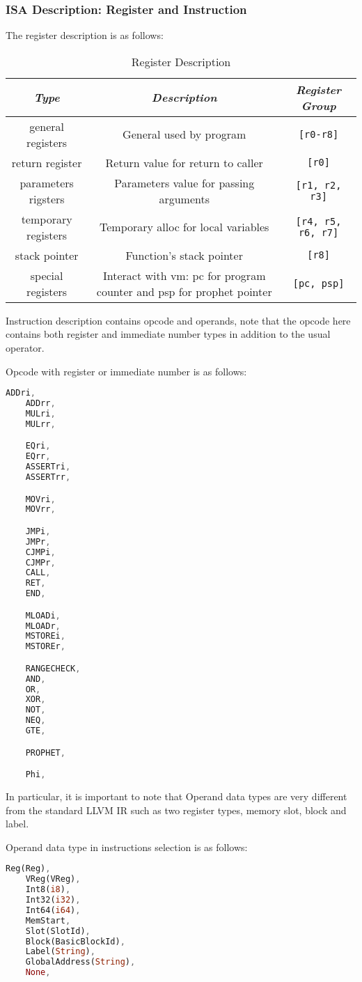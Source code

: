 \subsubsection{ISA Description: Register and Instruction}

The register description is as follows:
\begin{table}[!ht]
    \centering
    \begin{tabular}{|c|c|c|}
        \hline
        \textit{Type}  & \textit{Description} & \textit{Register Group}  \\ \hline
        general registers & General used by program & \verb|[r0-r8]| \\ \hline
        return register & Return value for return to caller & \verb|[r0]| \\ \hline
        parameters rigsters & Parameters value for passing arguments & \verb|[r1, r2, r3]| \\ \hline
        temporary registers & Temporary alloc for local variables & \verb|[r4, r5, r6, r7]| \\ \hline
        stack pointer & Function's stack pointer & \verb|[r8]| \\ \hline
        special registers & Interact with vm: pc for program counter and psp for prophet pointer & \verb|[pc, psp]| \\ \hline
    \end{tabular}
    \caption{Register Description}
    \label{table:register-description}
\end{table}

Instruction description contains opcode and operands,
note that the opcode here contains both register and immediate number types in addition to the usual operator.

Opcode with register or immediate number is as follows:
\begin{lstlisting}[language=rust]
    ADDri,
    ADDrr,
    MULri,
    MULrr,

    EQri,
    EQrr,
    ASSERTri,
    ASSERTrr,

    MOVri,
    MOVrr,

    JMPi,
    JMPr,
    CJMPi,
    CJMPr,
    CALL,
    RET,
    END,

    MLOADi,
    MLOADr,
    MSTOREi,
    MSTOREr,

    RANGECHECK,
    AND,
    OR,
    XOR,
    NOT,
    NEQ,
    GTE,

    PROPHET,

    Phi,
\end{lstlisting}

In particular, it is important to note that Operand data types are very different
from the standard LLVM IR such as two register types, memory slot, block and label.

Operand data type in instructions selection is as follows:
\begin{lstlisting}[language=rust]
    Reg(Reg),
    VReg(VReg),
    Int8(i8),
    Int32(i32),
    Int64(i64),
    MemStart,
    Slot(SlotId),
    Block(BasicBlockId),
    Label(String),
    GlobalAddress(String),
    None,
\end{lstlisting}
